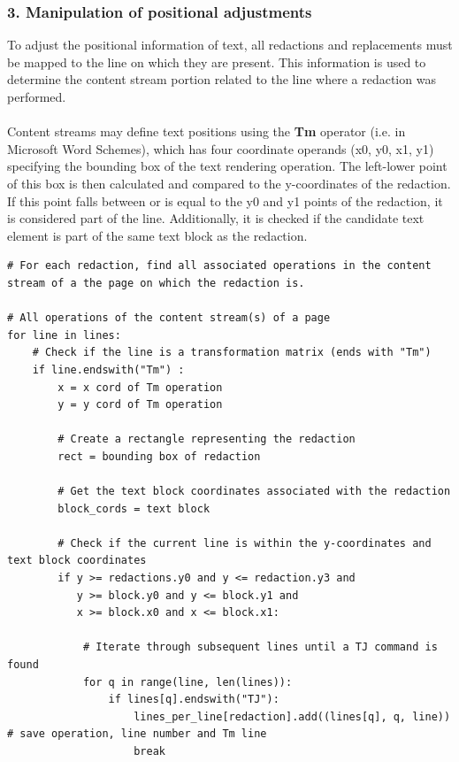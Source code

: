 \subsubsection{3. Manipulation of positional adjustments}
To adjust the positional information of text, all redactions and replacements must be mapped to the line on which they are present. This information is used to determine the content stream portion related to the line where a redaction was performed.
\\\\
Content streams may define text positions using the \textbf{Tm} operator 
(i.e. in Microsoft Word Schemes), which has four coordinate operands (x0, y0, x1, y1) specifying the bounding box of the text rendering operation. The left-lower point of this box is then calculated and compared to the y-coordinates of the redaction. If this point falls between or is equal to the y0 and y1 points of the redaction, it is considered part of the line. Additionally, it is checked if the candidate text element is part of the same text block as the redaction. 
\begin{lstlisting}[style=CStyle, caption=Pseudocode for identifying lines of text associated with each redaction based on their y-coordinates and text block.]
# For each redaction, find all associated operations in the content stream of a the page on which the redaction is.

# All operations of the content stream(s) of a page
for line in lines: 
    # Check if the line is a transformation matrix (ends with "Tm")
    if line.endswith("Tm") :
        x = x cord of Tm operation
        y = y cord of Tm operation

        # Create a rectangle representing the redaction
        rect = bounding box of redaction

        # Get the text block coordinates associated with the redaction
        block_cords = text block

        # Check if the current line is within the y-coordinates and text block coordinates
        if y >= redactions.y0 and y <= redaction.y3 and 
           y >= block.y0 and y <= block.y1 and 
           x >= block.x0 and x <= block.x1:

            # Iterate through subsequent lines until a TJ command is found
            for q in range(line, len(lines)):
                if lines[q].endswith("TJ"):
                    lines_per_line[redaction].add((lines[q], q, line)) # save operation, line number and Tm line
                    break

\end{lstlisting}
